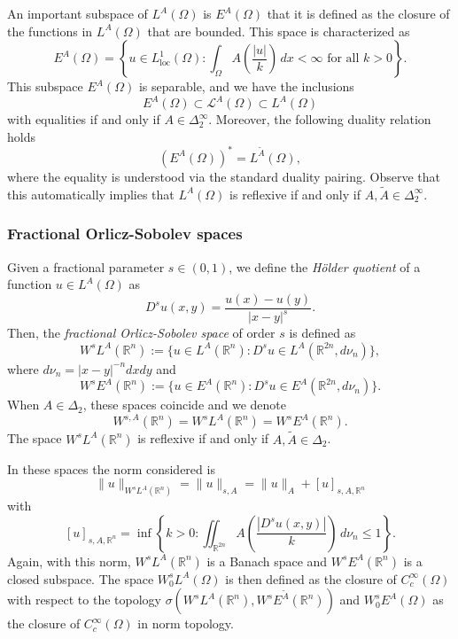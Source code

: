 \documentclass[12pt,reqno]{amsart}
\theoremstyle{definition}
\theoremstyle{remark}
\numberwithin{equation}{section}
\begin{document}
An important subspace of $L^A(\Omega)$ is $E^A(\Omega)$ that it is defined as the closure of the functions in $L^A(\Omega)$ that are bounded. This space is characterized as
$$
E^A(\Omega) = \left\{u\in L^1_\text{loc}(\Omega)\colon  \int_\Omega A\left(\frac{|u|}{k}\right)\, dx<\infty \text{ for all } k>0\right\}.
$$
\noindent This subspace $E^A(\Omega)$ is separable, and we have the inclusions
$$
E^A(\Omega)\subset \mathcal{L}^A(\Omega)\subset L^A(\Omega) %
$$
with equalities if and only if $A\in \Delta_2^\infty$.
Moreover, the following duality relation holds%
$$
(E^A(\Omega))^* = L^{\tilde A}(\Omega),
$$
where the equality is understood  via the standard duality pairing. Observe that this automatically implies that $L^A(\Omega)$ is reflexive if and only if $A, \tilde A\in \Delta_2^\infty$.

 

 


\subsubsection{Fractional Orlicz-Sobolev spaces}
Given a fractional parameter $s\in (0,1)$, we define the \emph{H\"older quotient} of a function $u\in L^A (\Omega)$ as
$$
D^su(x,y) = \frac{u(x)-u(y)}{|x-y|^s}.
$$
Then, the \emph{fractional Orlicz-Sobolev space} of order $s$ is defined as%
$$
W^sL^A(\mathbb{R}^n) := \{u\in L^A(\mathbb{R}^n)\colon D^su\in L^A(\mathbb{R}^{2n}, d\nu_n)\},%
$$
where $d\nu_n = |x-y|^{-n}dxdy$ and
$$
W^sE^A(\mathbb{R}^n) := \{u\in E^A(\mathbb{R}^n)\colon D^su\in E^A(\mathbb{R}^{2n}, d\nu_n)\}.
$$
When $A\in \Delta_2$, these spaces coincide and we denote
$$
W^{s, A}(\mathbb{R}^n) =W^sL^A(\mathbb{R}^n)= W^sE^A(\mathbb{R}^n).
$$
The space $W^s L^A(\mathbb{R}^n)$ is reflexive if and only if $A, \tilde  A\in \Delta_2$.%

In these spaces the norm considered is
$$
\|u\|_{W^sL^A(\mathbb{R}^n)} = \|u\|_{s, A} = \|u\|_A + [u]_{s,A,\mathbb{R}^n}
$$
with
$$
[u]_{s,A,\mathbb{R}^n}=\inf\left\{k >0 \colon \iint_{\mathbb{R}^{2n}} A\left(\frac{|D^s u(x,y)|}{k} \right)\,d\nu_n \leq 1\right\}.
$$
\noindent Again, with this norm, $W^sL^A(\mathbb{R}^n)$ is a Banach space and $W^sE^A(\mathbb{R}^n)$ is a closed subspace. The space $W^s_0 L^A(\Omega)$ is then defined as the closure of $C^\infty_c(\Omega)$ with respect to the topology $\sigma(W^sL^A(\mathbb{R}^n), W^sE^{\tilde A}(\mathbb{R}^n))$ and $W^s_0 E^A(\Omega)$ as the closure of $C^\infty_c(\Omega)$ in norm topology. %
\end{document}
